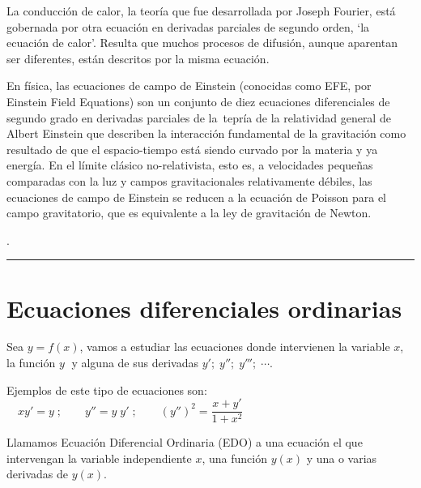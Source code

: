 La conducción de calor, la teoría que fue desarrollada por Joseph Fourier, está gobernada por otra ecuación en derivadas parciales de segundo orden, `la ecuación de calor'. Resulta que muchos procesos de difusión, aunque aparentan ser diferentes, están descritos por la misma ecuación. 

\footnotesize{En física, las ecuaciones de campo de Einstein (conocidas como EFE, por Einstein Field Equations) son un conjunto de diez ecuaciones diferenciales de segundo grado en derivadas parciales de la tepría de la relatividad general de Albert Einstein que describen la interacción fundamental de la gravitación como resultado de que el espacio-tiempo está siendo curvado por la materia y ya energía. En el límite clásico no-relativista, esto es, a velocidades pequeñas  comparadas con la luz y campos gravitacionales relativamente débiles, las ecuaciones de campo de Einstein se reducen a la ecuación de Poisson para el campo gravitatorio, que es equivalente a la ley de gravitación de Newton}\normalsize{.}

\footnotesize{}\normalsize{.}

\vspace{-8mm}
\begin{flushright}
\rule{250pt}{0.2pt}		
\end{flushright}	
\color{black}



\section{Ecuaciones diferenciales ordinarias}
	
	Sea $y=f(x)$, vamos a estudiar las ecuaciones donde intervienen la variable $x$, la función $y\;$ y alguna de sus derivadas $y';\; y''; \; y'''; \; \cdots$. 
	
	Ejemplos de este tipo de ecuaciones son:
	$\quad xy'= y\; ; \qquad y''=y\; y'\; ; \qquad (y'')^2=\dfrac {x+y'}{1+x^2}$

\begin{cuadro-naranja}
	
\begin{defi}
Llamamos Ecuación Diferencial Ordinaria (EDO) a una ecuación el que intervengan la variable independiente $x$, una función $y(x)$ y una o varias derivadas de $y(x)$.	
\end{defi}
\end{cuadro-naranja}


